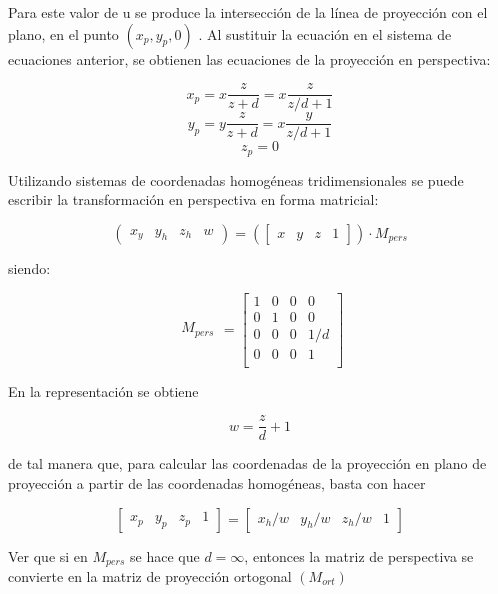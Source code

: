 Para este valor de u se produce la intersección de la línea de proyección con el plano, en el punto $(x_p, y_p, 0)$ . Al sustituir la ecuación en el sistema de ecuaciones anterior, se obtienen las ecuaciones de la proyección en perspectiva:

$$x_p = x\frac{z}{z + d} = x\frac{z}{z/d + 1}$$
$$y_p = y\frac{z}{z + d} = x\frac{y}{z/d + 1}$$
$$z_p = 0$$

Utilizando sistemas de coordenadas homogéneas tridimensionales se puede escribir la transformación en perspectiva en forma matricial:

\begin{equation}
\left(
\begin{array}{rccl}
x_y & y_h & z_h & w
\end{array}
\right)
=
\left(
\left[
\begin{array}{rccl}
x & y & z & 1
\end{array}
\right]
\right) \cdot M_{pers}
\end{equation}

siendo:

\begin{equation}
\begin{array}{rccl}
M_{pers}
\end{array}
=
\left[
\begin{array}{rccl}
1 & 0 & 0 & 0\\
0 & 1 & 0 & 0\\
0 & 0 & 0 & 1/d\\
0 & 0 & 0 & 1\\
\end{array}
\right]
\nonumber
\end{equation}

En la representación se obtiene

$$w=\frac{z}{d} + 1$$

de tal manera que, para calcular las coordenadas de la proyección en plano de proyección a partir de las coordenadas homogéneas, basta con hacer

\begin{equation}
\left[
\begin{array}{rccl}
x_p & y_p & z_p & 1
\end{array}
\right]
=
\left[
\begin{array}{rccl}
x_h/w & y_h/w & z_h/w & 1
\end{array}
\right]
\end{equation}

Ver que si en $M_{pers}$ se hace que $d = \infty$, entonces la matriz de perspectiva se convierte en la matriz de proyección ortogonal $(M_{ort})$

